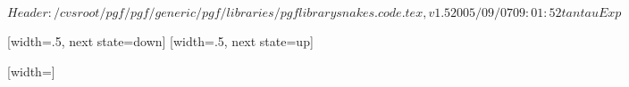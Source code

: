 \ProvidesPackageRCS[v\pgfversion] $Header: /cvsroot/pgf/pgf/generic/pgf/libraries/pgflibrarysnakes.code.tex,v 1.5 2005/09/07 09:01:52 tantau Exp $

%


\newdimen\pgfsnakesegmentamplitude
\newdimen\pgfsnakesegmentlength
\def\pgfsnakesegmentangle{45}
\def\pgfsnakesegmentobjectlength{\pgfsnakesegmentamplitude}
\def\pgfsnakesegmentaspect{0.5}

\pgfsnakesegmentlength=10pt
\pgfsnakesegmentamplitude=2.5pt



%

{
  [width=.5\pgfsnakesegmentlength,%
             next state=down]
  {
    \pgfpathlineto{\pgfpoint{.25\pgfsnakesegmentlength}{\pgfsnakesegmentamplitude}}
    \pgfpathlineto{\pgfpoint{.5\pgfsnakesegmentlength}{0pt}}
  }
  [width=.5\pgfsnakesegmentlength,%
               next state=up]
  {
    \pgfpathlineto{\pgfpoint{.25\pgfsnakesegmentlength}{-\pgfsnakesegmentamplitude}}
    \pgfpathlineto{\pgfpoint{.5\pgfsnakesegmentlength}{0pt}}
  }
  { \pgfpathlineto{\pgfpoint{\pgfsnakeremainingdistance}{0pt}} }
}



%

{
  [width=\pgfsnakesegmentlength]
  {
    \pgfpathlineto{\pgfpoint{\pgfsnakesegmentlength}{\pgfsnakesegmentamplitude}}
    \pgfpathlineto{\pgfpoint{\pgfsnakesegmentlength}{0pt}}
  }
  {
    \pgfpathlineto{\pgfpoint{\pgfsnakeremainingdistance}{0pt}}
  }
}


%

